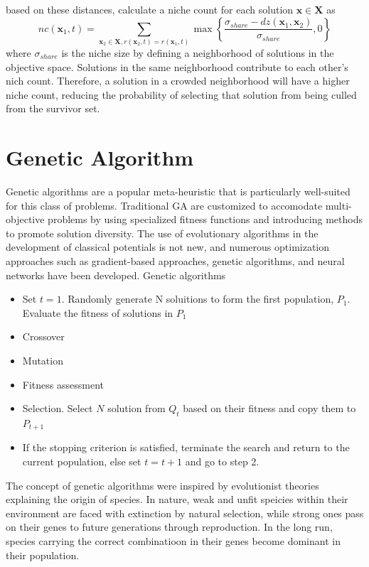 based on these distances, calculate a niche count for each solution $\bm{x}\in\bm{X}$ as
\begin{equation}
  nc(\bm{x}_1,t)=\sum_{\bm{x}_2\in\bm{X},r(\bm{x}_2,t)=r(\bm{x}_1,t)}
      \max\left\{ \frac{\sigma_{share}-dz(\bm{x}_1,\bm{x}_2)}
                       {\sigma_{share}},0
          \right\}
\end{equation}
where $\sigma_{share}$ is the niche size by defining a neighborhood of solutions in the objective space.  Solutions in the same neighborhood contribute to each other's nich count.  Therefore, a solution in a crowded neighborhood will have a higher niche count, reducing the probability of selecting that solution from being culled from the survivor set.


\section{Genetic Algorithm}

Genetic algorithms are a popular meta-heuristic that is particularly well-suited for this class of problems.  Traditional GA are customized to accomodate multi-objective problems by using specialized fitness functions and introducing methods to promote solution diversity.  The use of evolutionary algorithms in the development of classical potentials is not new, and numerous optimization approaches such as gradient-based approaches, genetic algorithms, and neural networks have been developed.
Genetic algorithms

\begin{itemize}
\item  Set $t=1$.  Randomly generate N soluitions to form the first population, $P_1$.  Evaluate the fitness of solutions in $P_1$
\item Crossover
\item Mutation
\item Fitness assessment
\item Selection.  Select $N$ solution from $Q_t$ based on their fitness and copy them to $P_{t+1}$
\item If the stopping criterion is satisfied, terminate the search and return to the current population, else set $t=t+1$ and go to step 2.
\end{itemize}
The concept of genetic algorithms were inspired by evolutionist theories explaining the origin of species\cite{holland1992_ga}.  In nature, weak and unfit speicies within their environment are faced with extinction by natural selection, while strong ones pass on their genes to future generations through reproduction.  In the long run, species carrying the correct combinatioon in their
    genes become dominant in their population.

